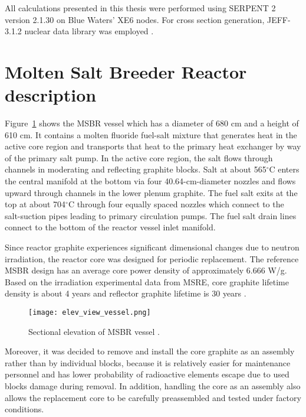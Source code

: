 All calculations presented in this thesis were performed using SERPENT 2 version 2.1.30 on Blue Waters’ XE6 nodes. For cross section generation, JEFF-3.1.2 nuclear data library was employed \cite{oecd/nea_data_bank_jeff-3.1.2_2014}. 

\section{Molten Salt Breeder Reactor description}
Figure~\ref{fig:ref_sect_msbr} shows the \gls{MSBR} vessel which has a diameter of 680 cm and a height of 610 cm. It contains a molten fluoride fuel-salt mixture that generates heat in the active core region and transports that heat to the primary heat exchanger by way of the primary salt pump. In the active core region, the salt flows through channels in moderating and reflecting graphite blocks. Salt at about 565$^{\circ}$C enters the central manifold at the bottom via four 40.64-cm-diameter nozzles and flows upward through channels in the lower plenum graphite. The fuel salt exits at the top at about 704$^{\circ}$C through four equally spaced nozzles which connect to the salt-suction pipes leading to primary circulation pumps. The fuel salt drain lines connect to the bottom of the reactor vessel inlet manifold.

Since reactor graphite experiences significant dimensional changes due to neutron irradiation, the reactor core was designed for periodic replacement. The reference \gls{MSBR} design has an average core power density of approximately 6.666 W/g. Based on the irradiation experimental data from \gls{MSRE}, core graphite lifetime density is about 4 years and reflector graphite lifetime is 30 years \cite{robertson_conceptual_1971}.

\begin{figure}[htp!] %
  \centering
  \vspace{-0.3em}
  \texttt{[image: elev\_view\_vessel.png]}
  \caption{Sectional elevation of \gls{MSBR} vessel \cite{robertson_conceptual_1971}.}
  \vspace{-0.6em}
  \label{fig:ref_sect_msbr}
\end{figure}

Moreover, it was decided to remove and install the core graphite as an assembly rather than by individual blocks, because it is relatively easier for maintenance personnel and has lower probability of radioactive elements escape due to used blocks damage during removal. In addition, handling the core as an assembly also allows the replacement core to be carefully preassembled and tested under factory conditions.

